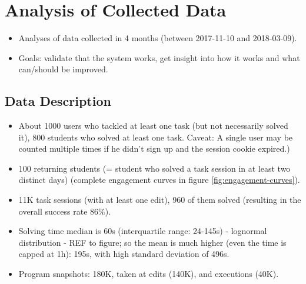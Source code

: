 \chapter{Analysis of Collected Data}
\label{chap:analysis}

\begin{itemize}
\item Analyses of data collected in 4 months (between 2017-11-10 and 2018-03-09).
\item Goals: validate that the system works, get insight into how it works
  and what can/should be improved.
\end{itemize}


\section{Data Description}

\begin{itemize}
\item About 1000 users who tackled at least one task (but not necessarily solved
  it), 800 students who solved at least one task. Caveat: A single user may be
  counted multiple times if he didn't sign up and the session cookie expired.)
\item 100 returning students (= student who solved a task session in at
  least two distinct days)
  (complete engagement curves in figure \ref{fig:engagement-curves}).
\item 11K task sessions (with at least one edit), 960 of them solved
  (resulting in the overall success rate $86 \%$).
\item Solving time median is 60s (interquartile range: 24-145s) - lognormal
  distribution - REF to figure; so the mean is much higher (even the time is
  capped at 1h): 195s, with high standard deviation of 496s.
\item Program snapshots: 180K, taken at edits (140K), and executions (40K).
\end{itemize}



